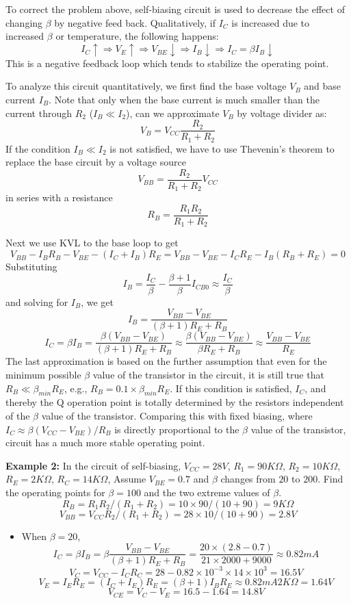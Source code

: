 \begin{itemize}
To correct the problem above, self-biasing circuit is used to decrease the 
effect of changing $\beta$ by negative feed back. Qualitatively, if $I_C$ is 
increased due to increased $\beta$ or temperature, the following happens:
\[	I_C \uparrow \Longrightarrow V_E \uparrow \Longrightarrow V_{BE} 
	\downarrow \Longrightarrow I_B \downarrow \Longrightarrow 
	I_C=\beta I_B \downarrow	\]
This is a negative feedback loop which tends to stabilize the operating point.

To analyze this circuit quantitatively, we first find the base voltage 
$V_B$ and base current $I_B$. Note that only when the base current is much 
smaller than the current through $R_2$ ($I_B \ll I_2$), can we approximate
$V_B$ by voltage divider as:
\[	V_B=V_{CC} \frac{R_2}{R_1+R_2}	\]
If the condition $I_B \ll I_2$ is not satisfied, we have to use Thevenin's 
theorem to replace the base circuit by a voltage source 
\[	V_{BB}=\frac{R_2}{R_1+R_2} V_{CC}	\]
in series with a resistance
\[	R_B=\frac{R_1R_2}{R_1+R_2}	\]


Next we use KVL to the base loop to get
\[ V_{BB}-I_BR_B-V_{BE}-(I_C+I_B)R_E=V_{BB}-V_{BE}-I_CR_E-I_B(R_B+R_E)=0 \]
Substituting 
\[	I_B=\frac{I_C}{\beta}-\frac{\beta+1}{\beta} I_{CB0}\approx
	\frac{I_C}{\beta}	\]
and solving for $I_B$, we get
\[	I_B=\frac{V_{BB}-V_{BE}}{(\beta+1) R_E+R_B}	\]
\[	I_C =\beta I_B=\frac{\beta(V_{BB}-V_{BE})}{(\beta+1) R_E+R_B}
            \approx \frac{\beta(V_{BB}-V_{BE})}{\beta R_E+R_B}
            \approx \frac{V_{BB}-V_{BE}}{R_E} \]
The last approximation is based on the further assumption that even for 
the minimum possible $\beta$ value of the transistor in the circuit,
it is still true that $R_B \ll \beta_{min} R_E$, e.g., 
$R_B =0.1\times \beta_{min} R_E$. If this condition is 
satisfied, $I_C$, and thereby the Q operation point is totally determined 
by the resistors independent of the $\beta$ value of the transistor. 
Comparing this with fixed biasing, where 
$I_C \approx \beta (V_{CC}-V_{BE})/R_B$ is directly proportional to the
$\beta$ value of the transistor, circuit has a much more stable operating
point.

{\bf Example 2:} In the circuit of self-biasing, $V_{CC}=28V$, 
$R_1=90 K\Omega$, $R_2=10 K\Omega$, $R_E=2 K\Omega$, $R_C=14 K\Omega$, 
Assume $V_{BE}=0.7$ and $\beta$ changes from $20$ to $200$. Find the 
operating points for $\beta=100$ and the two extreme values of $\beta$.
\[	R_B=R_1R_2/(R_1+R_2)=10\times 90/(10+90)=9 K\Omega	\]
\[	V_{BB}=V_{CC} R_2/(R_1+R_2)=28\times 10/(10+90)=2.8V	\]
\begin{itemize}
\item When $\beta=20$, 
\[ I_C=\beta I_B=\beta \frac{V_{BB}-V_{BE}}{(\beta+1) R_E+R_B}
	=\frac{20\times (2.8-0.7)}{21\times 2000+9000}
	\approx 0.82 mA	\]
\[ V_C=V_{CC}-I_CR_C=28-0.82\times 10^{-3} \times 14\times 10^3=16.5 V	\]
\[ V_E=I_E R_E=(I_C+I_E)R_E=(\beta+1)I_B R_E\approx 0.82 mA 2K\Omega=1.64V \]
\[ V_{CE}=V_C-V_E=16.5-1.64=14.8V \]


\end{itemize}
\end{itemize}
